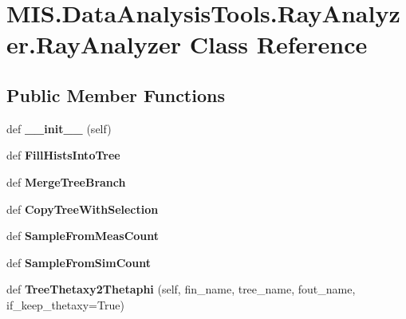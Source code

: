 \hypertarget{classMIS_1_1DataAnalysisTools_1_1RayAnalyzer_1_1RayAnalyzer}{}\section{M\+I\+S.\+Data\+Analysis\+Tools.\+Ray\+Analyzer.\+Ray\+Analyzer Class Reference}
\label{classMIS_1_1DataAnalysisTools_1_1RayAnalyzer_1_1RayAnalyzer}
\subsection*{Public Member Functions}
\begin{DoxyCompactItemize}
\item 
\mbox{\label{classMIS_1_1DataAnalysisTools_1_1RayAnalyzer_1_1RayAnalyzer_a69007e1fc60d4886047ca4caba9b070c}} 
def {\bfseries \+\_\+\+\_\+init\+\_\+\+\_\+} (self)
\item 
\mbox{\label{classMIS_1_1DataAnalysisTools_1_1RayAnalyzer_1_1RayAnalyzer_aab7b6bc1a7a236537371b747f63de4ec}} 
def {\bfseries Fill\+Hists\+Into\+Tree}
\item 
\mbox{\label{classMIS_1_1DataAnalysisTools_1_1RayAnalyzer_1_1RayAnalyzer_a73c7dd09a0839521cd06d96a41038e44}} 
def {\bfseries Merge\+Tree\+Branch}
\item 
\mbox{\label{classMIS_1_1DataAnalysisTools_1_1RayAnalyzer_1_1RayAnalyzer_aeaed59098c08b198c508a583481e72b7}} 
def {\bfseries Copy\+Tree\+With\+Selection}
\item 
\mbox{\label{classMIS_1_1DataAnalysisTools_1_1RayAnalyzer_1_1RayAnalyzer_a7655f4c8aa26ec81001c1e03ecb37d61}} 
def {\bfseries Sample\+From\+Meas\+Count}
\item 
\mbox{\label{classMIS_1_1DataAnalysisTools_1_1RayAnalyzer_1_1RayAnalyzer_ad184627f116f2a742bccea43c6ca58b5}} 
def {\bfseries Sample\+From\+Sim\+Count}
\item 
\mbox{\label{classMIS_1_1DataAnalysisTools_1_1RayAnalyzer_1_1RayAnalyzer_adb37fbb26c73919d10f7de1c062c8c16}} 
def {\bfseries Tree\+Thetaxy2\+Thetaphi} (self, fin\+\_\+name, tree\+\_\+name, fout\+\_\+name, if\+\_\+keep\+\_\+thetaxy=True)
\end{DoxyCompactItemize}
